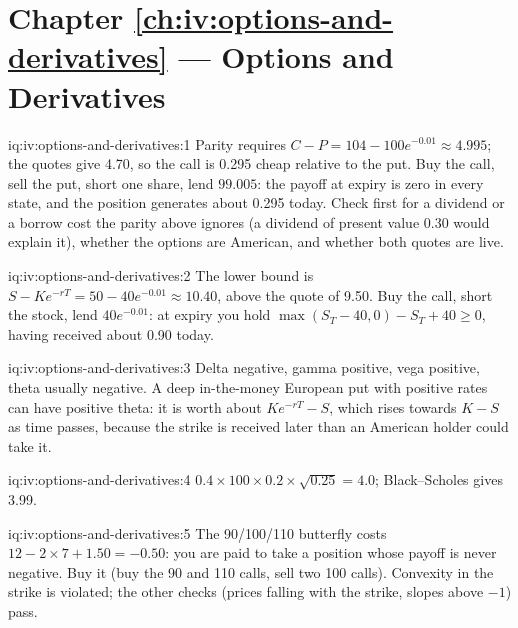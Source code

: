 \section*{Chapter \ref{ch:iv:options-and-derivatives} --- Options and Derivatives}

\begin{solution}{iq:iv:options-and-derivatives:1}
Parity requires $C - P = 104 - 100e^{-0.01} \approx 4.995$; the quotes give 4.70, so the call is 0.295 cheap relative to the
put. Buy the call, sell the put, short one share, lend $99.005$: the payoff at expiry is zero in every state, and the
position generates about 0.295 today. Check first for a dividend or a borrow cost the parity above ignores (a dividend of
present value 0.30 would explain it), whether the options are American, and whether both quotes are live.
\end{solution}

\begin{solution}{iq:iv:options-and-derivatives:2}
The lower bound is $S - Ke^{-rT} = 50 - 40e^{-0.01} \approx 10.40$, above the quote of 9.50. Buy the call, short the stock,
lend $40e^{-0.01}$: at expiry you hold $\max(S_T - 40, 0) - S_T + 40 \ge 0$, having received about 0.90 today.
\end{solution}

\begin{solution}{iq:iv:options-and-derivatives:3}
Delta negative, gamma positive, vega positive, theta usually negative. A deep in-the-money European put with positive
rates can have positive theta: it is worth about $Ke^{-rT} - S$, which rises towards $K - S$ as time passes, because the
strike is received later than an American holder could take it.
\end{solution}

\begin{solution}{iq:iv:options-and-derivatives:4}
$0.4 \times 100 \times 0.2 \times \sqrt{0.25} = 4.0$; Black--Scholes gives 3.99.
\end{solution}

\begin{solution}{iq:iv:options-and-derivatives:5}
The 90/100/110 butterfly costs $12 - 2 \times 7 + 1.50 = -0.50$: you are paid to take a position whose payoff is never
negative. Buy it (buy the 90 and 110 calls, sell two 100 calls). Convexity in the strike is violated; the other checks
(prices falling with the strike, slopes above $-1$) pass.
\end{solution}

